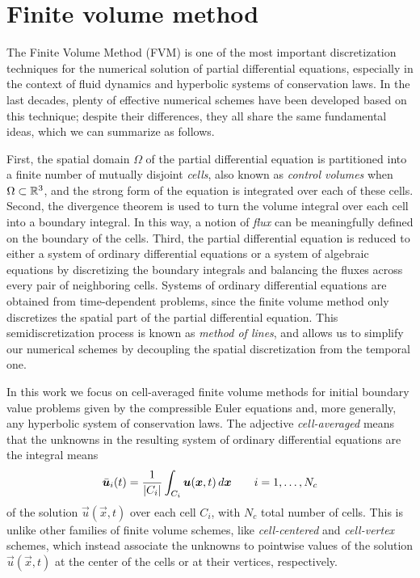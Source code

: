 \graphicspath{{./figures/chapter3/}}
\lstset{inputpath = ../MATLAB}

\chapter{Finite volume method} \label{ch:FVM}

The Finite Volume Method (FVM) is one of the most important discretization
techniques for the numerical solution of partial differential equations,
especially in the context of fluid dynamics and hyperbolic systems
of conservation laws. In the last decades, plenty of effective numerical
schemes have been developed based on this technique; despite their
differences, they all share the same fundamental ideas, which we can
summarize as follows.

First, the spatial domain $\Omega$ of the partial differential equation
is partitioned into a finite number of mutually disjoint \emph{cells},
also known as \emph{control volumes} when $\Omega \subset \mathbb{R}^3$,
and the strong form of the equation is integrated over each of these cells.
Second, the divergence theorem is used to turn the volume integral
over each cell into a boundary integral. In this way, a notion of \emph{flux}
can be meaningfully defined on the boundary of the cells.
Third, the partial differential equation is reduced to either a system
of ordinary differential equations or a system of algebraic equations
by discretizing the boundary integrals and balancing the fluxes
across every pair of neighboring cells. Systems of ordinary differential
equations are obtained from time-dependent problems, since the finite
volume method only discretizes the spatial part of the partial differential
equation. This semidiscretization process is known as \emph{method of lines},
and allows us to simplify our numerical schemes by decoupling the spatial
discretization from the temporal one.

In this work we focus on cell-averaged finite volume methods for initial
boundary value problems given by the compressible Euler equations and,
more generally, any hyperbolic system of conservation laws.
The adjective \emph{cell-averaged} means that the unknowns in the resulting
system of ordinary differential equations are the integral means
\[
\bar{\bm{u}}_i(t) = \frac{1}{\left\lvert C_i\right\rvert} \int_{C_i} \bm{u}(\bm{x},t) \, d\bm{x}
\qquad \text{$i = 1,\dots,N_c$}
\]
of the solution $\vec{u}(\vec{x},t)$ over each cell $C_i$, with
$N_c$ total number of cells.
This is unlike other families of finite volume schemes,
like \emph{cell-centered} and \emph{cell-vertex} schemes, which instead
associate the unknowns to pointwise values of the solution
$\vec{u}(\vec{x},t)$ at the center of the cells or at their vertices, respectively.

